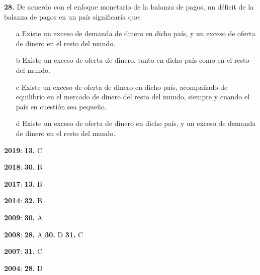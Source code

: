 \documentclass{nuevotema}
\begin{document}
\textbf{28.} De acuerdo con el enfoque monetario de la balanza de pagos, un déficit de la balanza de pagos en un país significaría que:
\begin{itemize}
	\item[a] Existe un exceso de demanda de dinero en dicho país, y un exceso de oferta de dinero en el resto del mundo.
	\item[b] Existe un exceso de oferta de dinero, tanto en dicho país como en el resto del mundo.
	\item[c] Existe un exceso de oferta de dinero en dicho país, acompañado de equilibrio en el mercado de dinero del resto del mundo, siempre y cuando el país en cuestión sea pequeño.
	\item[d] Existe un exceso de oferta de dinero en dicho país, y un exceso de demanda de dinero en el resto del mundo.
\end{itemize}

\notas

\textbf{2019}: \textbf{13.} C

\textbf{2018}: \textbf{30.} B

\textbf{2017}: \textbf{13.} B

\textbf{2014}: \textbf{32.} B

\textbf{2009}: \textbf{30.} A

\textbf{2008}: \textbf{28.} A \textbf{30.} D \textbf{31.} C

\textbf{2007}: \textbf{31.} C

\textbf{2004}: \textbf{28.} D

\bibliografia
\end{document}
